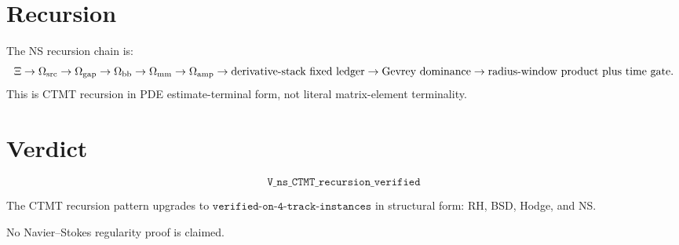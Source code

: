 \documentclass{article}
\begin{document}
\section{Recursion}

The NS recursion chain is:
\[
\Xi
\to
\Omega_{\rm src}
\to
\Omega_{\rm gap}
\to
\Omega_{\rm bb}
\to
\Omega_{\rm mm}
\to
\Omega_{\rm amp}
\to
\text{derivative-stack fixed ledger}
\to
\text{Gevrey dominance}
\to
\text{radius-window product plus time gate}.
\]
This is CTMT recursion in PDE estimate-terminal form, not literal matrix-element terminality.

\section{Verdict}

\[
\boxed{\texttt{V\_ns\_CTMT\_recursion\_verified}}
\]

The CTMT recursion pattern upgrades to \(\texttt{verified-on-4-track-instances}\) in structural form: RH, BSD, Hodge, and NS.

No Navier--Stokes regularity proof is claimed.
\end{document}
